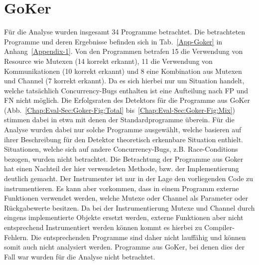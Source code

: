 \section{GoKer}
Für die Analyse wurden insgesamt 34 Programme betrachtet. Die betrachteten 
Programme und deren Ergebnisse befinden sich in Tab.~\ref{App-Goker} 
in Anhang~\ref{Appendix-1}. Von den Programmen betrafen 15 die 
Verwendung von Resource wie Mutexen (14 korrekt erkannt), 11 die 
Verwendung von Kommunikationen (10 korrekt erkannt) und 8 eine Kombination aus Mutexen und 
Channel (7 korrekt erkannt). Da es sich hierbei nur um Situation handelt, welche 
tatsächlich Concurrency-Bugs enthalten ist eine Aufteilung nach FP und FN nicht 
möglich.
Die Erfolgsraten des Detektors für die Programme aus GoKer 
(Abb.~\ref{Chap:Eval-Sec:Goker-Fig:Total} bis~\ref{Chap:Eval-Sec:Goker-Fig:Mix})
stimmen dabei in etwa mit denen der Standardprogramme überein.
Für die Analyse wurden dabei nur solche Programme ausgewählt,
welche basieren auf ihrer Beschreibung für den Detektor theoretisch erkennbare 
Situation enthielt. Situationen, welche sich auf andere Concurrency-Bugs,
z.B. Race-Conditions bezogen, wurden nicht betrachtet. 
Die Betrachtung der Programme aus Goker hat einen Nachteil der hier 
verwendeten Methode, bzw. der Implementierung deutlich gemacht.
Der Instrumenter ist nur in der Lage den vorliegenden Code zu instrumentieren. 
Es kann aber vorkommen, dass in einem Programm externe Funktionen 
verwendet werden, welche Mutexe oder Channel als Parameter oder 
Rückgabewerte besitzen. Da bei der Instrumentierung Mutexe und Channel 
durch eingens implementierte Objekte ersetzt werden, externe Funktionen 
aber nicht entsprechend Instrumentiert werden können kommt es 
hierbei zu Compiler-Fehlern. Die entsprechenden Programme sind daher nicht 
lauffähig und können somit auch nicht analysiert werden. Programme aus GoKer, 
bei denen dies der Fall war wurden für die Analyse nicht betrachtet. 

